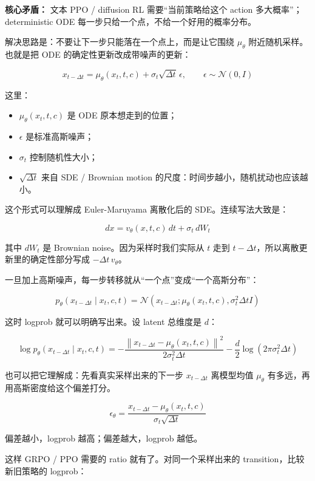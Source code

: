 \begin{warnbox}
\textbf{核心矛盾：} 文本 PPO / diffusion RL 需要“当前策略给这个 action 多大概率”；deterministic ODE 每一步只给一个点，不给一个好用的概率分布。
\end{warnbox}

解决思路是：不要让下一步只能落在一个点上，而是让它围绕 $\mu_\theta$ 附近随机采样。也就是把 ODE 的确定性更新改成带噪声的更新：

\[
x_{t-\Delta t}
=
\mu_\theta(x_t,t,c)
+
\sigma_t\sqrt{\Delta t}\,\epsilon,
\qquad
\epsilon\sim\mathcal{N}(0,I)
\]

这里：

\begin{itemize}[leftmargin=1.5em]
  \item $\mu_\theta(x_t,t,c)$ 是 ODE 原本想走到的位置；
  \item $\epsilon$ 是标准高斯噪声；
  \item $\sigma_t$ 控制随机性大小；
  \item $\sqrt{\Delta t}$ 来自 SDE / Brownian motion 的尺度：时间步越小，随机扰动也应该越小。
\end{itemize}

这个形式可以理解成 Euler-Maruyama 离散化后的 SDE。连续写法大致是：

\[
dx
=
v_\theta(x,t,c)\,dt
+
\sigma_t\,dW_t
\]

其中 $dW_t$ 是 Brownian noise。因为采样时我们实际从 $t$ 走到 $t-\Delta t$，所以离散更新里的确定性部分写成 $-\Delta t\,v_\theta$。

一旦加上高斯噪声，每一步转移就从“一个点”变成“一个高斯分布”：

\[
p_\theta(x_{t-\Delta t}\mid x_t,c,t)
=
\mathcal{N}
\left(
x_{t-\Delta t};
\mu_\theta(x_t,t,c),
\sigma_t^2\Delta t I
\right)
\]

这时 logprob 就可以明确写出来。设 latent 总维度是 $d$：

\[
\log p_\theta(x_{t-\Delta t}\mid x_t,c,t)
=
-
\frac{
\left\|
x_{t-\Delta t}
-
\mu_\theta(x_t,t,c)
\right\|^2
}{
2\sigma_t^2\Delta t
}
-
\frac{d}{2}\log(2\pi\sigma_t^2\Delta t)
\]

也可以把它理解成：先看真实采样出来的下一步 $x_{t-\Delta t}$ 离模型均值 $\mu_\theta$ 有多远，再用高斯密度给这个偏差打分。

\[
\epsilon_\theta
=
\frac{
x_{t-\Delta t}
-
\mu_\theta(x_t,t,c)
}{
\sigma_t\sqrt{\Delta t}
}
\]

偏差越小，logprob 越高；偏差越大，logprob 越低。

这样 GRPO / PPO 需要的 ratio 就有了。对同一个采样出来的 transition，比较新旧策略的 logprob：


